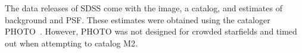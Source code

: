 



The data releases of SDSS come with the image, a catalog, and estimates of background and PSF. These estimates were obtained using the cataloger PHOTO~\cite{lupton2001sdss}. However, PHOTO was not designed for crowded starfields and timed out when attempting to catalog M2. 

